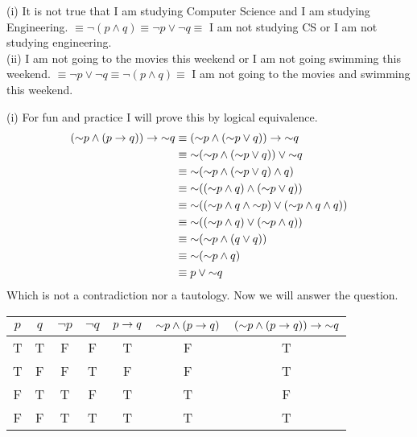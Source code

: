 \documentclass{report}
\begin{document}
\sol (i) It is not true that I am studying Computer Science and I am studying Engineering. $\equiv \lnot (p \land q) \equiv \lnot p \lor \lnot q\equiv$ I am not studying CS or I am not studying engineering. \\

\sol (ii) I am not going to the movies this weekend or I am not going swimming this weekend. $\equiv \lnot p \lor \lnot q \equiv \lnot(p\land q)\equiv$ I am not going to the movies and swimming this weekend.

\sol (i)
For fun and practice I will prove this by logical equivalence.
\begin{align*}
	(\mathord{\sim} p\land (p\rightarrow q)) \rightarrow \mathord{\sim} q &\equiv (\mathord{\sim} p\land (\mathord{\sim} p \lor q)) \rightarrow \mathord{\sim} q \\
		&\equiv \mathord{\sim} (\mathord{\sim} p\land (\mathord{\sim} p \lor q)) \lor \mathord{\sim} q \\
		&\equiv \mathord{\sim} (\mathord{\sim} p\land (\mathord{\sim} p \lor q) \land q) \\
		&\equiv \mathord{\sim} ((\mathord{\sim} p\land q) \land (\mathord{\sim} p \lor q)) \\
		&\equiv \mathord{\sim} ((\mathord{\sim} p\land q \land \mathord{\sim} p) \lor (\mathord{\sim} p\land q \land q)) \\
		&\equiv \mathord{\sim} ((\mathord{\sim} p\land q) \lor (\mathord{\sim} p\land q)) \\
		&\equiv \mathord{\sim} (\mathord{\sim} p\land (q \lor q)) \\
		&\equiv \mathord{\sim} (\mathord{\sim} p\land q) \\
		&\equiv p\lor \mathord{\sim} q 
\end{align*}
Which is not a contradiction nor a tautology. Now we will answer the question.
\begin{center}
	\begin{tabular}{|cc||cc||c||c||c|}
		\hline
			$p$ &$q$ &$\lnot p$ &$\lnot q$ &$p\rightarrow q$ &$\mathord{\sim} p\land(p\rightarrow q)$ &$(\mathord{\sim} p\land(p\rightarrow q))\rightarrow\mathord{\sim} q$ \\ \hline
			T & T & F & F & T & F & T \\
			T & F & F & T & F & F & T \\
			F & T & T & F & T & T & F \\
			F & F & T & T & T & T & T \\ \hline
	\end{tabular}
\end{center}
\end{document}
